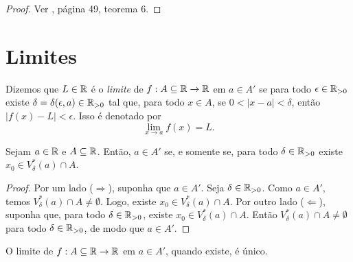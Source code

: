 \begin{proof}
    Ver \cite{analisereal1}, página 49, teorema 6. \blackproof
\end{proof}

\section{Limites}

\begin{definition}
    Dizemos que $L \in \mathbb{R}$ é o \emph{limite} de $f : A \subseteq \mathbb{R} \to \mathbb{R}$ em $a \in A'$ se para todo $\epsilon \in \mathbb{R}_{>0}$ existe $\delta = \delta(\epsilon, a) \in \mathbb{R}_{>0}$ tal que, para todo $x \in A$, se $0<|x-a|<\delta$, então $|f(x)-L| < \epsilon$. Isso é denotado por 
        \[
            \lim_{x \to a} f(x) = L.
        \]
\end{definition}

\begin{lemma} \label{calc1.lemma:existe_x0}
    Sejam $a \in \mathbb{R}$ e $A \subseteq \mathbb{R}$. Então, $a \in A'$ se, e somente se, para todo $\delta \in \mathbb{R}_{>0}$ existe $x_0 \in V^*_{\delta}(a) \cap A$.
\end{lemma}

\begin{proof}
    Por um lado ($\Rightarrow$), suponha que $a \in A'$. Seja $\delta \in \mathbb{R}_{>0}$. Como $a \in A'$, temos $V^*_{\delta}(a) \cap A \neq \emptyset$. Logo, existe $x_0 \in V^*_{\delta}(a) \cap A$. Por outro lado ($\Leftarrow$), suponha que, para todo $\delta \in \mathbb{R}_{>0}$, existe $x_0 \in V^*_{\delta}(a) \cap A$. Então $V^*_{\delta}(a) \cap A \neq \emptyset$ para todo $\delta \in \mathbb{R}_{>0}$, de modo que $a \in A'$. \blackproof
\end{proof}

\begin{proposition}[Unicidade] \label{teo.calc1:unicidade_limite_bilateral}
    O limite de $f : A \subseteq \mathbb{R} \to \mathbb{R}$ em $a \in A'$, quando existe, é único.
\end{proposition}

